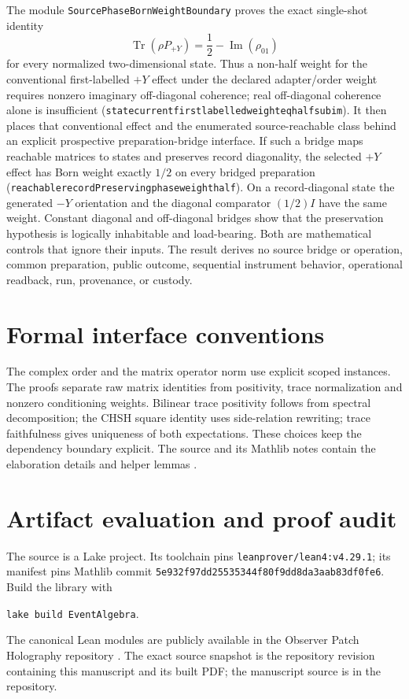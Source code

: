 \documentclass[11pt]{article}
\renewcommand{\_}{\textunderscore\allowbreak}
\theoremstyle{remark}
\begin{document}
The module \texttt{SourcePhaseBornWeightBoundary} proves the exact
single-shot identity
\[
  \operatorname{Tr}(\rho P_{+Y})=\frac12-\operatorname{Im}(\rho_{01})
\]
for every normalized two-dimensional state. Thus a non-half weight for the
conventional first-labelled $+Y$ effect under the declared adapter/order
weight requires nonzero imaginary off-diagonal coherence; real off-diagonal
coherence alone is insufficient
(\texttt{state\_current\_first\_labelled\_weight\_eq\_half\_sub\_im}). It then places
that conventional effect and the enumerated source-reachable class behind an
explicit prospective preparation-bridge interface. If such a bridge maps
reachable matrices to states and preserves record diagonality, the selected
$+Y$ effect has Born weight exactly $1/2$ on every bridged preparation
(\texttt{reachable\_recordPreserving\_phase\_weight\_half}). On a
record-diagonal state the generated $-Y$ orientation and the diagonal
comparator $(1/2)I$ have the same weight. Constant diagonal and off-diagonal
bridges show that the preservation hypothesis is logically inhabitable and
load-bearing. Both are mathematical controls that ignore their inputs. The
result derives no source bridge or operation, common preparation, public
outcome, sequential instrument behavior, operational readback, run,
provenance, or custody.

\section{Formal interface conventions}
\label{sec:mathlib}

The complex order and the matrix operator norm use explicit scoped
instances. The proofs separate raw matrix identities from positivity,
trace normalization and nonzero conditioning weights. Bilinear trace
positivity follows from spectral decomposition; the CHSH square identity
uses side-relation rewriting; trace faithfulness gives uniqueness of both
expectations. These choices keep the dependency boundary explicit. The
source and its Mathlib notes contain the elaboration details and helper
lemmas \cite{observerPatchHolographyRepo}.

\section{Artifact evaluation and proof audit}
\label{sec:evaluation}

The source is a Lake project. Its toolchain pins
\texttt{leanprover/lean4:v4.29.1}; its manifest pins Mathlib commit
\texttt{5e932f97dd25535344f80f9dd8da3aab83df0fe6}. Build the library with
\begin{center}
\texttt{lake build EventAlgebra}.
\end{center}
The canonical Lean modules are publicly available in the Observer Patch
Holography repository \cite{observerPatchHolographyRepo}. The exact source
snapshot is the repository revision containing this manuscript and its built
PDF; the manuscript source is in the repository.
\end{document}

